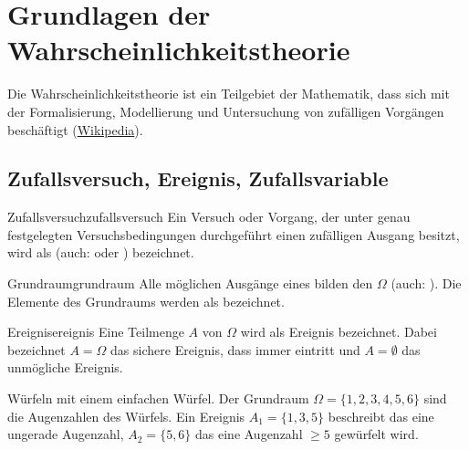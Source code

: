 \chapter{Grundlagen der Wahrscheinlichkeitstheorie}

Die Wahrscheinlichkeitstheorie ist ein Teilgebiet der Mathematik, dass sich mit
der Formalisierung, Modellierung und Untersuchung von zufälligen Vorgängen
beschäftigt (\href{https://de.wikipedia.org/wiki/Wahrscheinlichkeitstheorie}
{Wikipedia}).

\section{Zufallsversuch, Ereignis, Zufallsvariable}

\begin{definition}{Zufallsversuch}{zufallsversuch}
Ein Versuch oder Vorgang, der unter genau festgelegten Versuchsbedingungen
durchgeführt einen zufälligen Ausgang besitzt, wird als 
(auch:  oder )
bezeichnet.
\end{definition}


\begin{definition}{Grundraum}{grundraum}
Alle möglichen Ausgänge eines 
bilden den  $\Omega$ (auch: ). Die
Elemente des Grundraums werden als  bezeichnet.
\end{definition}


\begin{definition}{Ereignis}{ereignis}
Eine Teilmenge $A$ von $\Omega$ wird als Ereignis bezeichnet. Dabei bezeichnet
$A = \Omega$ das sichere Ereignis, dass immer eintritt und $A = \emptyset$ das
unmögliche Ereignis.
\end{definition}

\begin{example}\label{bsp:ereignis}
Würfeln mit einem einfachen Würfel. Der Grundraum $\Omega = \{1,2,3,4,5,6\}$
sind die Augenzahlen des Würfels. Ein Ereignis $A_1 = \{1,3,5\}$ beschreibt das
eine ungerade Augenzahl, $A_2 = \{5,6\}$ das
eine Augenzahl $\ge 5$ gewürfelt wird.
\end{example}


